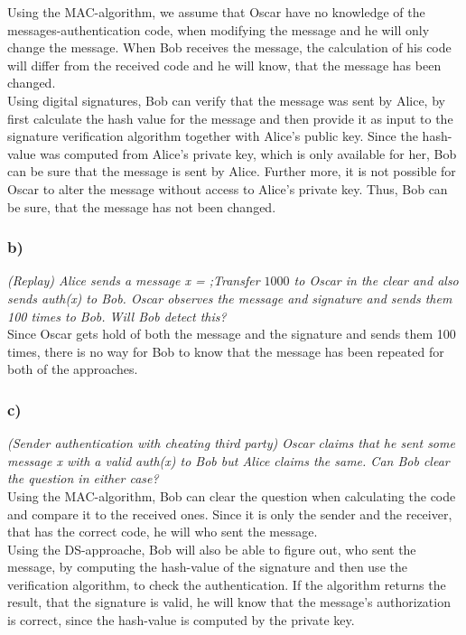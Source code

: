\documentclass{article}
\begin{document}
Using the MAC-algorithm, we assume that Oscar have no knowledge of the messages-authentication code, when modifying the message and he will only change the message. When Bob receives the message, the calculation of his code will differ from the received code and he will know, that the message has been changed. \\ 

Using digital signatures, Bob can verify that the message was sent by Alice, by first calculate the hash value for the message and then provide it as input to the signature verification algorithm together with Alice's public key. Since the hash-value was computed from Alice's private key, which is only available for her, Bob can be sure that the message is sent by Alice. Further more, it is not possible for Oscar to alter the message without access to Alice's private key. Thus, Bob can be sure, that the message has not been changed. 

\subsubsection{b)}
\textit{(Replay) Alice sends a message x = ;Transfer $1000$ to Oscar in the clear and also sends auth(x) to Bob. Oscar observes the message and signature and sends them 100 times to Bob. Will Bob detect this?}\\ 

Since Oscar gets hold of both the message and the signature and sends them 100 times, there is no way for Bob to know that the message has been repeated for both of the approaches. 

\subsubsection{c)}
\textit{(Sender authentication with cheating third party) Oscar claims that he sent some message x with a valid auth(x) to Bob but Alice claims the same. Can Bob clear the question in either case?}\\

Using the MAC-algorithm, Bob can clear the question when calculating the code and compare it to the received ones. Since it is only the sender and the receiver, that has the correct code, he will who sent the message. \\

Using the DS-approache, Bob will also be able to figure out, who sent the message, by computing the hash-value of the signature and then use the verification algorithm, to check the authentication. If the algorithm returns the result, that the signature is valid, he will know that the message's authorization is correct, since the hash-value is computed by the private key. 
\end{document}
